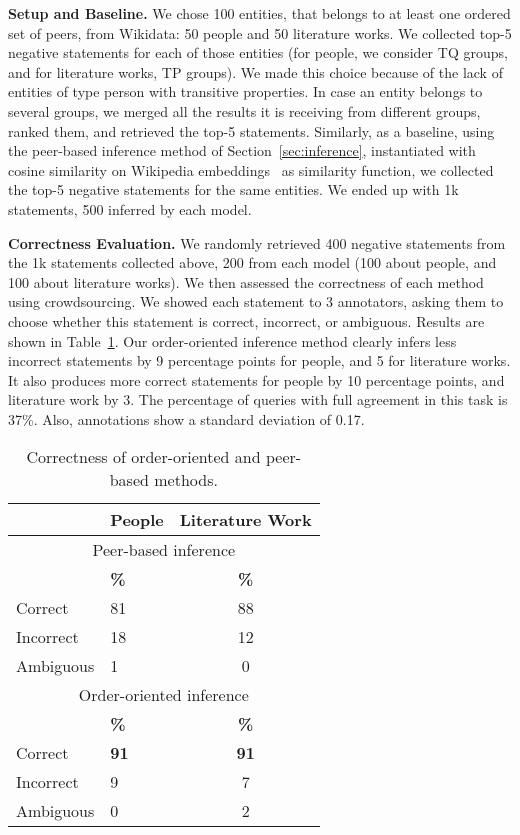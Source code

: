 \noindent
\textbf{Setup and Baseline.} We chose 100 entities, that belongs to at least one ordered set of peers, from Wikidata: 50 people and 50 literature works. We collected top-5 negative statements for each of those entities (for people, we consider TQ groups, and for literature works, TP groups). We made this choice because of the lack of entities of type person with transitive properties. In case an entity belongs to several groups, we merged all the results it is receiving from different groups, ranked them, and retrieved the top-5 statements. Similarly, as a baseline, using the peer-based inference method of Section~\ref{sec:inference}, instantiated with cosine similarity on Wikipedia embeddings~\cite{wikipedia2vec} as similarity function, we collected the top-5 negative statements for the same entities. We ended up with 1k statements, 500 inferred by each model.

\noindent
\textbf{Correctness Evaluation.} We randomly retrieved 400 negative statements from the 1k statements collected above, 200 from each model (100 about people, and 100 about literature works). We then assessed the correctness of each method using crowdsourcing. We showed each statement to 3 annotators, asking them to choose whether this statement is correct, incorrect, or ambiguous. Results are shown in Table~\ref{tab:simvstempcorrec}. Our order-oriented inference method clearly infers less incorrect statements by 9 percentage points for people, and 5 for literature works. It also produces more correct statements for people by 10 percentage points, and literature work by 3. The percentage of queries with full agreement in this task is 37\%. Also, annotations show a standard deviation of 0.17.
\begin{table}
\centering
  \caption{Correctness of order-oriented and peer-based methods.}
  \label{tab:simvstempcorrec}
  \begin{tabular}{llc}
    \toprule
   & \multicolumn{1}{l}{\bf{People}}  & \multicolumn{1}{c}{\bf{Literature Work}}  \\
    \midrule
    \multicolumn{3}{c}{Peer-based inference}\\
    \midrule
           & \multicolumn{1}{l}{\bf{\%}}  & \multicolumn{1}{c}{\bf{\%}}  \\
    \midrule
Correct & 81 & 88\\
Incorrect &  18 & 12\\
Ambiguous & 1 & 0\\
\midrule
\multicolumn{3}{c}{Order-oriented inference}\\
\midrule
       & \multicolumn{1}{l}{\bf{\%}}  & \multicolumn{1}{c}{\bf{\%}}  \\
    \midrule
Correct & \bf{91} & \bf{91}\\
Incorrect & 9 & 7\\
Ambiguous & 0 & 2 \\
    \bottomrule
  \end{tabular}
  
  \end{table}

